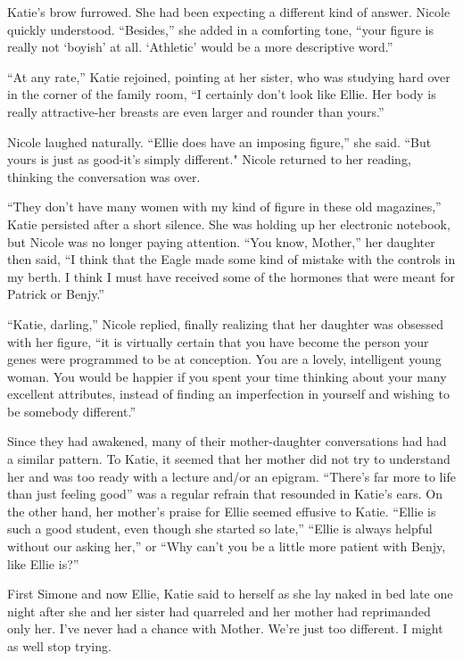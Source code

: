 \documentclass[]{article}
\begin{document}
{Katie’s brow furrowed.  She had been expecting a different kind of answer.  Nicole quickly understood.  “Besides,” she added in a comforting tone, “your figure is really not ‘boyish’ at all.  ‘Athletic’ would be a more descriptive word.”

“At any rate,” Katie rejoined, pointing at her sister, who was studying hard over in the corner of the family room, “I certainly don’t look like Ellie.  Her body is really attractive-her breasts are even larger and rounder than yours.”

Nicole laughed naturally.  “Ellie does have an imposing figure,” she said.  “But yours is just as good-it’s simply different."  Nicole returned to her reading, thinking the conversation was over.

“They don’t have many women with my kind of figure in these old magazines,” Katie persisted after a short silence.  She was holding up her electronic notebook, but Nicole was no longer paying attention.  “You know, Mother,” her daughter then said, “I think that the Eagle made some kind of mistake with the controls in my berth.  I think I must have received some of the hormones that were meant for Patrick or Benjy.”

“Katie, darling,” Nicole replied, finally realizing that her daughter was obsessed with her figure, “it is virtually certain that you have become the person your genes were programmed to be at conception.  You are a lovely, intelligent young woman.  You would be happier if you spent your time thinking about your many excellent attributes, instead of finding an imperfection in yourself and wishing to be somebody different.”

Since they had awakened, many of their mother-daughter conversations had had a similar pattern.  To Katie, it seemed that her mother did not try to understand her and was too ready with a lecture and/or an epigram.  “There’s far more to life than just feeling good” was a regular refrain that resounded in Katie’s ears.  On the other hand, her mother’s praise for Ellie seemed effusive to Katie.  “Ellie is such a good student, even though she started so late,” “Ellie is always helpful without our asking her,” or “Why can’t you be a little more patient with Benjy, like Ellie is?”

First Simone and now Ellie, Katie said to herself as she lay naked in bed late one night after she and her sister had quarreled and her mother had reprimanded only her.  I’ve never had a chance with Mother.  We’re just too different.  I might as well stop trying.

}
\end{document}
